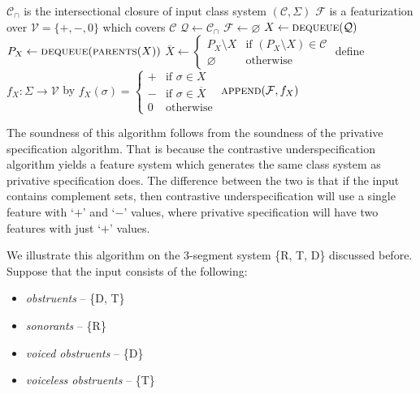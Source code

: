 \documentclass[11pt, oneside]{article}   	%
\begin{document}
\vspace{\baselineskip} \noindent \begin{algorithmic}
    \REQUIRE $\mathcal C_\cap$ is the intersectional closure of input class system $(\mathcal C, \Sigma)$
    \ENSURE $\mathcal F$ is a featurization over $\mathcal V = \{ +, -, 0 \}$ which covers $\mathcal C$
    \STATE
    \STATE $\mathcal Q \leftarrow \mathcal C_\cap$
    \STATE $\mathcal F \leftarrow \varnothing$
    \STATE
        \STATE $X \leftarrow \textsc{dequeue}(\mathcal Q)$
            \STATE $P_X \leftarrow \textsc{dequeue}(\textsc{parents}(X))$
            \STATE
            \STATE $\overline{X} \leftarrow \begin{cases}
                P_X \setminus X & \text{if } (P_X \setminus X) \in \mathcal C \\
                \varnothing     & \text{otherwise}
                \end{cases}$
            \STATE
            \STATE define $f_X : \Sigma \rightarrow \mathcal V$ by $f_X (\sigma) = \begin{cases}
                    + & \text{if } \sigma \in X \\
                    - & \text{if } \sigma \in \overline{X} \\
                    0 & \text{otherwise}
                    \end{cases}$
            \STATE $\textsc{append}(\mathcal F, f_X)$
        \ENDIF
    \ENDWHILE
\end{algorithmic}

\vspace{\baselineskip} \noindent The soundness of this algorithm follows from the soundness of the privative specification algorithm. That is because the contrastive underspecification algorithm yields a feature system which generates the same class system as privative specification does. The difference between the two is that if the input contains complement sets, then contrastive underspecification will use a single feature with `$+$' and `$-$' values, where privative specification will have two features with just `$+$' values.

\vspace{\baselineskip} We illustrate this algorithm on the 3-segment system \{R, T, D\} discussed before. Suppose that the input consists of the following: \begin{itemize}
    \item \textit{obstruents} -- \{D, T\}
    \item \textit{sonorants} -- \{R\}
    \item \textit{voiced obstruents} -- \{D\}
    \item \textit{voiceless obstruents} -- \{T\}
    \end{itemize}
\end{document}
